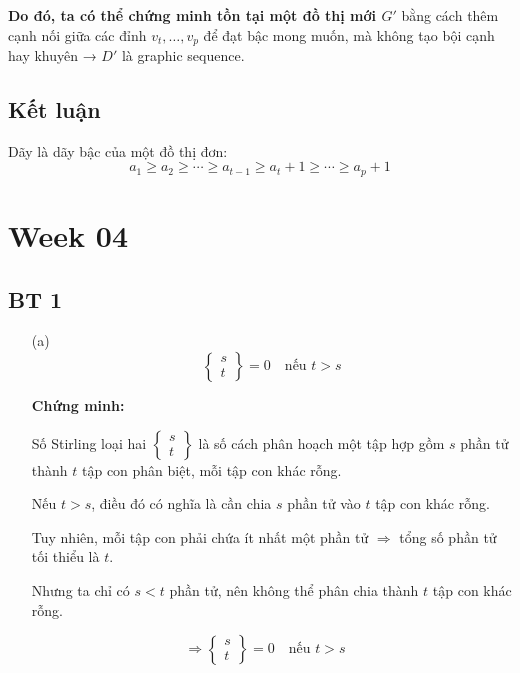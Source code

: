 \documentclass{article}
\begin{document}
	\textbf{Do đó, ta có thể chứng minh tồn tại một đồ thị mới \( G' \)} bằng cách thêm cạnh nối giữa các đỉnh \( v_t, \ldots, v_p \) để đạt bậc mong muốn, mà không tạo bội cạnh hay khuyên → \( D' \) là graphic sequence.
	
	\subsection*{Kết luận}
	
	Dãy là dãy bậc của một đồ thị đơn:
	\[
	a_1 \geq a_2 \geq \cdots \geq a_{t-1} \geq a_t + 1 \geq \cdots \geq a_p + 1
	\]
	
	\section*{Week 04}
	\subsection*{BT 1}
	\begin{enumerate}
		\item[(a)] 
		\[
		\left\{ \begin{matrix}
			s \\
			t
		\end{matrix} \right\} = 0 \quad \text{nếu } t > s
		\]
		
		\textbf{Chứng minh:}
		
		Số Stirling loại hai $\left\{ \begin{matrix}
			s \\
			t
		\end{matrix} \right\}$ là số cách phân hoạch một tập hợp gồm $s$ phần tử thành $t$ tập con phân biệt, mỗi tập con khác rỗng.
		
		Nếu $t > s$, điều đó có nghĩa là cần chia $s$ phần tử vào $t$ tập con khác rỗng.
		
		Tuy nhiên, mỗi tập con phải chứa ít nhất một phần tử $\Rightarrow$ tổng số phần tử tối thiểu là $t$. 
		
		Nhưng ta chỉ có $s < t$ phần tử, nên không thể phân chia thành $t$ tập con khác rỗng.
		
		\[
		\Rightarrow \left\{ \begin{matrix}
			s \\
			t
		\end{matrix} \right\} = 0 \quad \text{nếu } t > s \quad
		\]
	\end{enumerate}
	
\end{document}
